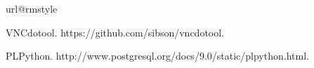 
%
%
%

\begin{thebibliography}{10}
\providecommand{\url}[1]{#1}
\csname url@rmstyle\endcsname
\providecommand{\newblock}{\relax}
\providecommand{\bibinfo}[2]{#2}
\providecommand\BIBentrySTDinterwordspacing{\spaceskip=0pt\relax}
\providecommand\BIBentryALTinterwordstretchfactor{4}
\providecommand\BIBentryALTinterwordspacing{\spaceskip=\fontdimen2\font plus
\BIBentryALTinterwordstretchfactor\fontdimen3\font minus
  \fontdimen4\font\relax}
\providecommand\BIBforeignlanguage[2]{{%
\expandafter\ifx\csname l@#1\endcsname\relax
\typeout{** WARNING: IEEEtran.bst: No hyphenation pattern has been}%
\typeout{** loaded for the language `#1'. Using the pattern for}%
\typeout{** the default language instead.}%
\else
\language=\csname l@#1\endcsname
\fi
#2}}





VNCdotool. https://github.com/sibson/vncdotool.



PLPython. http://www.postgresql.org/docs/9.0/static/plpython.html.













\end{thebibliography}
